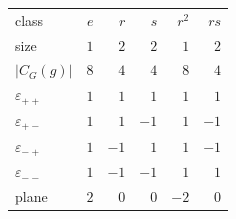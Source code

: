 \begin{tabular}{lrrrrr}
\toprule
class & $e$ & $r$ & $s$ & $r^2$ & $rs$ \\
size & $1$ & $2$ & $2$ & $1$ & $2$ \\
$|C_G(g)|$ & $8$ & $4$ & $4$ & $8$ & $4$ \\
\midrule
$\varepsilon_{++}$ & $1$ & $1$ & $1$ & $1$ & $1$ \\
$\varepsilon_{+-}$ & $1$ & $1$ & $-1$ & $1$ & $-1$ \\
$\varepsilon_{-+}$ & $1$ & $-1$ & $1$ & $1$ & $-1$ \\
$\varepsilon_{--}$ & $1$ & $-1$ & $-1$ & $1$ & $1$ \\
plane & $2$ & $0$ & $0$ & $-2$ & $0$ \\
\bottomrule
\end{tabular}
